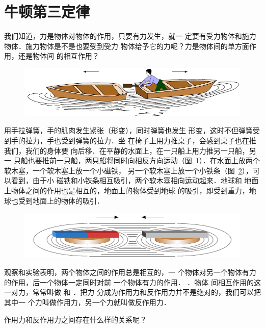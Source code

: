 \section{牛顿第三定律} 
我们知道，力是物体对物体的作用，只要有力发生，就一
定要有受力物体和施力物体．施力物体是不是也要受到受力
物体给予它的力呢？力是物体间的单方面作用，还是物体间
的相互作用？
\begin{figure}[htbp]
    \centering
    \includegraphics{fig/A/1-13.pdf} 
    \caption{} \label{fig_A_1-13} 
\end{figure}

    用手拉弹簧，手的肌肉发生紧张（形变），同时弹簧也发生
形变，这时不但弹簧受到手的拉力，手也受到弹簧的拉力．坐
在椅子上用力推桌子，会感到桌子也在推我们，我们的身体要
向后移．在平静的水面上，在一只船上用力推另一只船，另一
只船也要推前一只船，两只船将同时向相反方向运动（图~\ref{fig_A_1-13}）．在水面上放两个软木塞，一个软木塞上放一个小磁铁，
另一个软木塞上放一个小铁条（图~\ref{fig_A_1-14}），可以看到，由于小
磁铁和小铁条相互吸引，两个软木塞相向运动起来．地球和
地面上物体之间的作用也是相互的，地面上的物体受到地球
的吸引，即受到重力，地球也受到地面上的物体的吸引．


\begin{figure}[htbp]
    \centering
    \includegraphics{fig/A/1-14.pdf} 
    \caption{} \label{fig_A_1-14} 
\end{figure} 

观察和实验表明，两个物体之间的作用总是相互的，一
个物体对另一个物体有力的作用，后一个物体一定同时对前
一个物体有力的作用． ．物体
间相互作用的这一对力，常常叫做 和 ．把力
分成为作用力和反作用力并不是绝对的，我们可以把其中一
个力叫做作用力，另一个力就叫做反作用力．

    作用力和反作用力之间存在什么样的关系呢？



